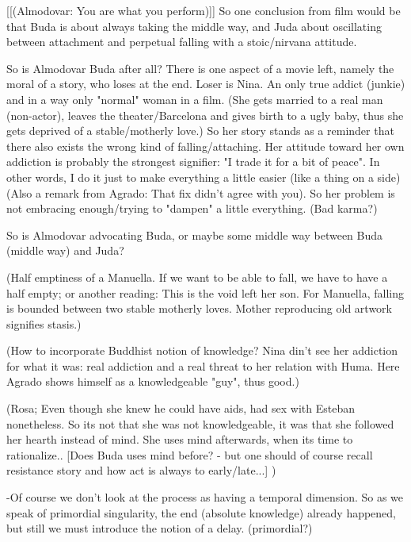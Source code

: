 \documentclass[10pt]{book}
\begin{document}
[[(Almodovar: You are what you perform)]]
So one conclusion from film would be that Buda is about always taking the middle way, and Juda about oscillating between attachment and perpetual falling with a stoic/nirvana attitude.

So is Almodovar Buda after all? There is one aspect of a movie left, namely the moral of a story, who loses at the end. Loser is Nina. An only true addict (junkie) and in a way only "normal" woman in a film. (She gets married to a real man (non-actor), leaves the theater/Barcelona and gives birth to a ugly baby, thus she gets deprived of a stable/motherly love.) So her story stands as a reminder that there also exists the wrong kind of falling/attaching. Her attitude toward her own addiction is probably the strongest signifier: "I trade it for a bit of peace". In other words, I do it just to make everything a little easier (like a thing on a side) (Also a remark from Agrado: That fix didn't agree with you). So her problem is not embracing enough/trying to "dampen" a little everything. (Bad karma?)

So is Almodovar advocating Buda, or maybe some middle way between Buda (middle way) and Juda?  

(Half emptiness of a Manuella. If we want to be able to fall, we have to have a half empty; or another reading: This is the void left her son.
For Manuella, falling is bounded between two stable motherly loves.
Mother reproducing old artwork signifies stasis.)

(How to incorporate Buddhist notion of knowledge? Nina din't see her addiction for what it was: real addiction and a real threat to her relation with Huma. Here Agrado shows himself as a knowledgeable "guy", thus good.)

(Rosa; Even though she knew he could have aids, had sex with Esteban nonetheless. So its not that she was not knowledgeable, it was that she followed her hearth instead of mind. She uses mind afterwards, when its time to rationalize.. [Does Buda uses mind before? - but one should of course recall resistance story and how act is always to early/late...] )


-Of course we don't look at the process as having a temporal dimension. So as we speak of primordial singularity, the end (absolute knowledge) already happened, but still we must introduce the notion of a delay. (primordial?) 
\end{document}
